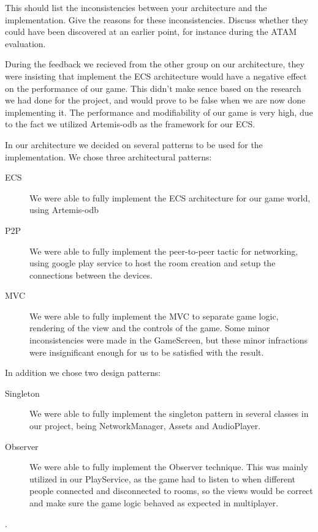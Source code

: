 
This should list the inconsistencies between your architecture and the implementation. Give the reasons for these inconsistencies. Discuss whether they could have been discovered at an earlier point, for instance during the ATAM evaluation.\\



During the feedback we recieved from the other group on our architecture, they were insisting that implement the ECS architecture would have a negative effect on the performance of our game. This didn’t make sence based on the research we had done for the project, and would prove to be false when we are now done implementing it. The performance and modifiability of our game is very high, due to the fact we utilized Artemis-odb as the framework for our ECS.



In our architecture we decided on several patterns to be used for the implementation. We chose three architectural patterns:


\begin{description}
	\item [ECS] We were able to fully implement the ECS architecture for our game world, using Artemis-odb
	\item [P2P] We were able to fully implement the peer-to-peer tactic for networking, using google play service to host the room creation and setup the connections between the devices.
	\item [MVC] We were able to fully implement the MVC to separate game logic, rendering of the view and the controls of the game. Some minor inconsistencies were made in the GameScreen, but these minor infractions were insignificant enough for us to be satisfied with the result.
\end{description}


In addition we chose two design patterns:

\begin{description}
	\item [Singleton] We were able to fully implement the singleton pattern in several classes in our project, being NetworkManager, Assets and AudioPlayer.
	\item [Observer] We were able to fully implement the Observer technique. This was mainly utilized in our PlayService, as the game had to listen to when different people connected and disconnected to rooms, so the views would be correct and make sure the game logic behaved as expected in multiplayer.
\end{description} .

